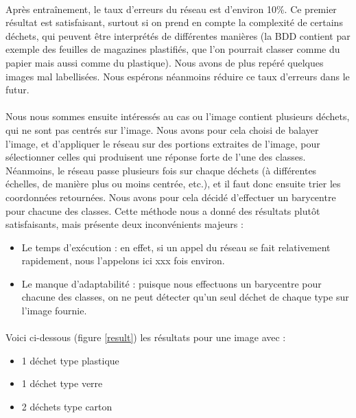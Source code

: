 \documentclass[11pt,a4paper,twocolumn]{article}
\begin{document}
\paragraph*{}

Après entraînement, le taux d’erreurs du réseau est d’environ 10\%. Ce premier résultat est satisfaisant, surtout si on prend en compte la complexité de certains déchets, qui peuvent être interprétés de différentes manières (la BDD contient par exemple des feuilles de magazines plastifiés, que l’on pourrait classer comme du papier mais aussi comme du plastique). Nous avons de plus repéré quelques images mal labellisées. Nous espérons néanmoins réduire ce taux d’erreurs dans le futur.

\paragraph*{}

Nous nous sommes ensuite intéressés au cas ou l’image contient plusieurs déchets, qui ne sont pas centrés sur l’image. Nous avons pour cela choisi de balayer l’image, et d’appliquer le réseau sur des portions extraites de l’image, pour sélectionner celles qui produisent une réponse forte de l’une des classes. Néanmoins, le réseau passe plusieurs fois sur chaque déchets (à différentes échelles, de manière plus ou moins centrée, etc.), et il faut donc ensuite trier les coordonnées retournées. Nous avons pour cela décidé d’effectuer un barycentre pour chacune des classes.
Cette méthode nous a donné des résultats plutôt satisfaisants, mais présente deux inconvénients majeurs :
\begin{itemize}
  \item Le temps d’exécution : en effet, si un appel du réseau se fait relativement rapidement, nous l’appelons ici xxx fois environ.
  \item Le manque d'adaptabilité : puisque nous effectuons un barycentre pour chacune des classes, on ne peut détecter qu’un seul déchet de chaque type sur l’image fournie.
\end{itemize}

\paragraph*{}

Voici ci-dessous (figure \ref{result}) les résultats pour une image avec :
\begin{itemize}
  \item 1 déchet type plastique
  \item 1 déchet type verre
  \item 2 déchets type carton
\end{itemize}
\end{document}
